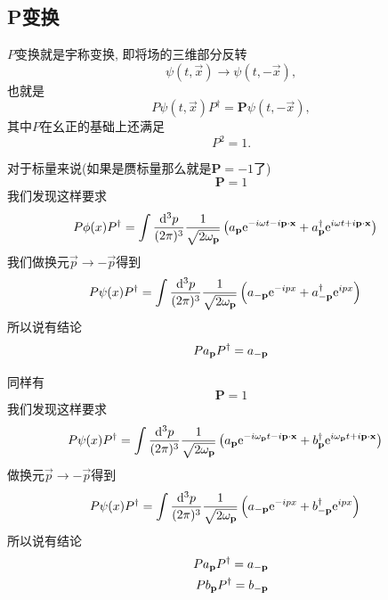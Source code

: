 \subsection{P变换}\label{sec-parity}
$P$变换就是宇称变换, 即将场的三维部分反转
\begin{equation}
    \psi(t, \vec x)\to\psi(t, -\vec x), 
\end{equation}
也就是
\begin{equation}
    P\psi(t, \vec x)P^\dagger=\boldsymbol{\mathbf P}\psi(t, -\vec x), 
\end{equation}
其中$P$在幺正的基础上还满足
\begin{equation}
    P^2=1.
\end{equation}

\begin{example}[实标量场的宇称变换]
    对于标量来说(如果是赝标量那么就是$\boldsymbol{\mathbf P}=-1$了)
    \begin{equation}
        \boldsymbol{\mathbf P}=1
    \end{equation}
    我们发现这样要求
    \begin{align}
        &P\phi(x)P^\dagger=\int\ldsq p\left(\a p\exp{-i\omega t-i\vec p\cdot\vec x}+\a p^\dagger\exp{i\omega t+i\vec p\cdot\vec x}\right)
    \end{align}
    我们做换元$\vec p\to-\vec p$得到
    \begin{align}
        &P\psi(x)P^\dagger=\int\ldsq p\left(\a {-p}\exp{-ipx}+\a {-p}^\dagger\exp{ipx}\right)
    \end{align}
    所以说有结论
    \begin{equation}
        Pa_{\mathbf{p}} P^\dagger=a_{\mathbf{-p}}
    \end{equation}
\end{example}
\begin{example}[复标量场的宇称变换]
    同样有
    \begin{equation}
        \boldsymbol{\mathbf P}=1
    \end{equation}
    我们发现这样要求
    \begin{align}
        &P\psi(x)P^\dagger=\int\ldsq p\left(\a p\exp{-i\om p t-i\vec p\cdot\vec x}+\b p^\dagger\exp{i\om p t+i\vec p\cdot\vec x}\right)
    \end{align}
    做换元$\vec p\to-\vec p$得到
    \begin{align}
        &P\psi(x)P^\dagger=\int\ldsq p\left(\a {-p}\exp{-ipx}+\b {-p}^\dagger\exp{ipx}\right)
    \end{align}
    所以说有结论
    \begin{align}
        Pa_{\mathbf{p}} P^\dagger=a_{\mathbf{-p}}\\
        Pb_{\mathbf{p}} P^\dagger=b_{\mathbf{-p}}
    \end{align}
\end{example}
